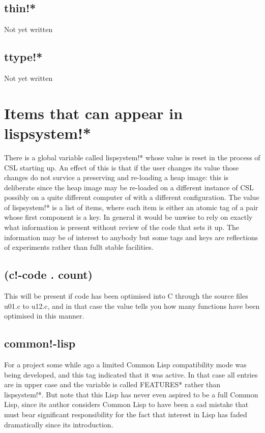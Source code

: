 \documentclass[a4paper,11pt]{article}
\begin{document}
\subsection{\ttfamily thin!*}
Not yet written

\subsection{\ttfamily ttype!*}
Not yet written




\section{Items that can appear in {\ttfamily lispsystem!*}}

There is a global variable called {\ttfamily lispsystem!*} whose value is
reset in the process of CSL starting up. An effect of this is that if the
user changes its value those changes do not survice a preserving and
re-loading a heap image: this is deliberate since the heap image may be
re-loaded on a different instance of CSL possibly on a quite different
computer of with a different configuration. The value of {\ttfamily
lispsystem!*} is a list of items, where each item is either an atomic tag
of a pair whose first component is a key. In general it would be unwise
to rely on exactly what information is present without review of the code
that sets it up. The information may be of interest to anybody but some tags
and keys are reflections of experiments rather than fullt stable facilities.

\subsection{\ttfamily (c!-code . count)}
This will be present if code has been optimised into C through the source
files u01.c to u12.c, and in that case the value tells you how many functions
have been optimised in this manner.

\subsection{\ttfamily common!-lisp}
For a project some while ago a limited Common Lisp compatibility mode was
being developed, and this tag indicated that it was active. In that case all
entries are in upper case and the variable is called {\ttfamily *FEATURES*}
rather than {\ttfamily lispsystem!*}. But note that this Lisp has never even
aspired to be a full Common Lisp, since its author considers Common Lisp to
have been a sad mistake that must bear significant responsibility for the
fact that interest in Lisp has faded dramatically since its introduction.
\end{document}
